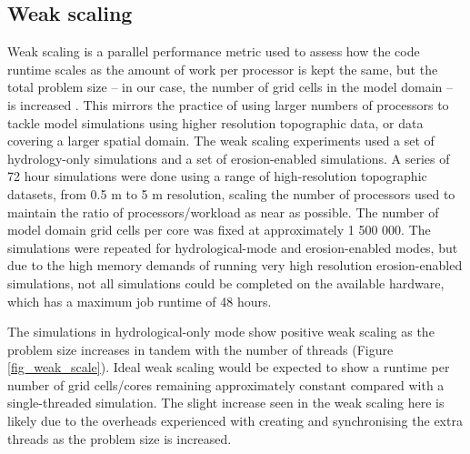 \subsection{Weak scaling}

Weak scaling is a parallel performance metric used to assess how the code runtime scales as the amount of work per processor is kept the same, but the total problem size -- in our case, the number of grid cells in the model domain -- is increased \citep{gustafson1988reevaluating}. This mirrors the practice of using larger numbers of processors to tackle model simulations using higher resolution topographic data, or data covering a larger spatial domain. The weak scaling experiments used a set of hydrology-only simulations and a set of erosion-enabled simulations. A series of 72 hour simulations were done using a range of high-resolution topographic datasets, from 0.5 m to 5 m resolution, scaling the number of processors used to maintain the ratio of processors/workload as near as possible. The number of model domain grid cells per core was fixed at approximately 1 500 000. The simulations were repeated for hydrological-mode and erosion-enabled modes, but due to the high memory demands of running very high resolution erosion-enabled simulations, not all simulations could be completed on the available hardware, which has a maximum job runtime of 48 hours.

The simulations in hydrological-only mode show positive weak scaling as the problem size increases in tandem with the number of threads (Figure \ref{fig_weak_scale}). Ideal weak scaling would be expected to show a runtime per number of grid cells/cores remaining approximately constant compared with a single-threaded simulation. The slight increase seen in the weak scaling here is likely due to the overheads experienced with creating and synchronising the extra threads as the problem size is increased.

